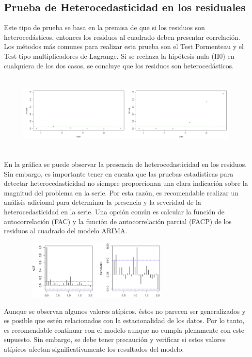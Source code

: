 \documentclass[11pt]{article}
\begin{document}
\subsection{Prueba de Heterocedasticidad en los residuales}
\begin{flushleft}
    Este tipo de prueba se basa en la premisa de que si los residuos son heterocedásticos, entonces los residuos al cuadrado deben presentar correlación. Los métodos más comunes para realizar esta prueba son el Test Pormenteau y el Test tipo multiplicadores de Lagrange. Si se rechaza la hipótesis nula (H0) en cualquiera de los dos casos, se concluye que los residuos son heterocedásticos.
\end{flushleft}
    \begin{center}
        \begin{figure}[!ht]
        \centering
        \includegraphics[width=16cm, height=4cm]{Imagenes/Heterocedasticidad.png}
        \vspace{0cm}
        \end{figure}
    \end{center}
\begin{flushleft}
    En la gráfica se puede observar la presencia de heterocedasticidad en los residuos. Sin embargo, es importante tener en cuenta que las pruebas estadísticas para detectar heterocedasticidad no siempre proporcionan una clara indicación sobre la magnitud del problema en la serie. Por esta razón, es recomendable realizar un análisis adicional para determinar la presencia y la severidad de la heterocedasticidad en la serie. Una opción común es calcular la función de autocorrelación (FAC) y la función de autocorrelación parcial (FACP) de los residuos al cuadrado del modelo ARIMA.
\end{flushleft}

\begin{figure}
    \centering
    \includegraphics[width=8cm, height=3cm]{Imagenes/acf_pacf_res.png}
  \end{figure}  
Aunque se observan algunos valores atípicos, éstos no parecen ser generalizados y es posible que estén relacionados con la estacionalidad de los datos. Por lo tanto, es recomendable continuar con el modelo aunque no cumpla plenamente con este supuesto. Sin embargo, se debe tener precaución y verificar si estos valores atípicos afectan significativamente los resultados del modelo.
\end{document}
